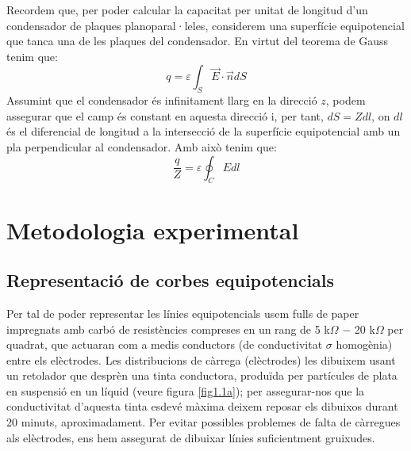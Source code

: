 \documentclass[a4paper,10.5pt]{report}
\begin{document}
Recordem que, per poder calcular la capacitat per unitat de longitud d'un condensador de plaques planoparal·leles, considerem una superfície equipotencial que tanca una de les plaques del condensador. En virtut del teorema de Gauss tenim que:
\begin{equation}
	q = \varepsilon \int_S \vec{E}\cdot \vec{n}dS
\end{equation}
Assumint que el condensador és infinitament llarg en la direcció $z$, podem assegurar que el camp és constant en aquesta direcció i, per tant, $dS = Zdl$, on $dl$ és el diferencial de longitud a la intersecció de la superfície equipotencial amb un pla perpendicular al condensador. Amb això tenim que:
\begin{equation}
	\frac{q}{Z} = \varepsilon \oint_C E dl \label{eq1.13}
\end{equation}
\section{Metodologia experimental}
\subsection{Representació de corbes equipotencials}
Per tal de poder representar les línies equipotencials usem fulls de paper impregnats amb carbó de resistències compreses en un rang de 5 k$\Omega$ $-$ 20 k$\Omega$ per quadrat, que actuaran com a medis conductors (de conductivitat $\sigma$ homogènia) entre els elèctrodes. Les distribucions de càrrega (elèctrodes) les dibuixem usant un retolador que desprèn una tinta conductora, produïda per partícules de plata en suspensió en un líquid (veure figura \ref{fig1.1a}); per assegurar-nos que la conductivitat d'aquesta tinta esdevé màxima deixem reposar els dibuixos durant 20 minuts, aproximadament. Per evitar possibles problemes de falta de càrregues als elèctrodes, ens hem assegurat de dibuixar línies suficientment gruixudes.
\end{document}
